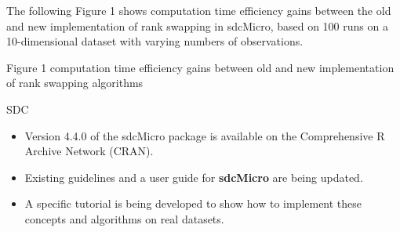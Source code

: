 \documentclass[SDCmaster.tex]{subfiles}
\begin{document}
\begin{frame}The following Figure 1 shows computation time efficiency gains between the old and new implementation of rank swapping in sdcMicro, based on 100 runs on a 10-dimensional dataset with varying numbers of observations.

Figure 1 computation time efficiency gains between old and new implementation of rank swapping algorithms

SDC
\end{frame}

\begin{frame}
	\begin{itemize}
\item Version 4.4.0 of the sdcMicro package is available on the Comprehensive R Archive Network (CRAN).
\item Existing guidelines and a user guide for \textbf{sdcMicro} are being updated. 
\item A specific tutorial is being developed to show how to implement these concepts and algorithms on real datasets. 
	\end{itemize}


\end{frame}
\end{document}
